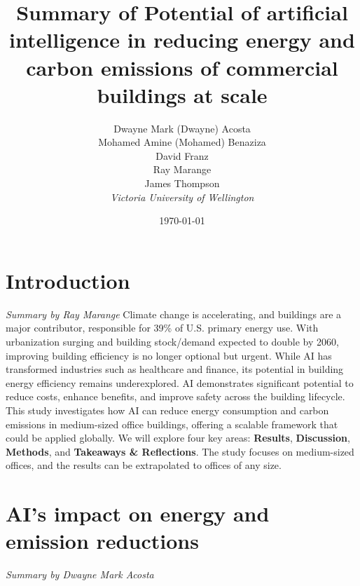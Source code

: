 \documentclass[conference,a4paper]{IEEEtran}
\begin{document}
\newcommand{\cfigure}[2]{%
  \begin{figure}[h]
    \centering
    \texttt{[image: figures/\#1.png]}%
    \caption{#2}%
    \label{fig:#1}%
  \end{figure}%

}
\title{Summary of Potential of artificial intelligence in reducing energy and carbon emissions of commercial buildings at scale}

\author{Dwayne Mark (Dwayne) Acosta \\ Mohamed Amine (Mohamed) Benaziza \\ David Franz \\ Ray Marange \\ James Thompson\\
\textit{Victoria University of Wellington}\\}
\date{\today}

\maketitle

\section*{Introduction}
\textit{Summary by Ray Marange}
Climate change is accelerating, and buildings are a major contributor, responsible for 39\% of U.S. primary energy use. With urbanization surging and building stock/demand expected to double by 2060, improving building efficiency is no longer optional but urgent.
While AI has transformed industries such as healthcare and finance, its potential in building energy efficiency remains underexplored. AI demonstrates significant potential to reduce costs, enhance benefits, and improve safety across the building lifecycle. This study \cite{dingPotentialArtificialIntelligence2024} investigates how AI can reduce energy consumption and carbon emissions in medium-sized office buildings, offering a scalable framework that could be applied globally.
We will explore four key areas: \textbf{Results}, \textbf{Discussion}, \textbf{Methods}, and \textbf{Takeaways \& Reflections}. The study focuses on medium-sized offices, and the results can be extrapolated to offices of any size.

\section*{AI's impact on energy and emission reductions}
\textit{Summary by Dwayne Mark Acosta}
\end{document}
